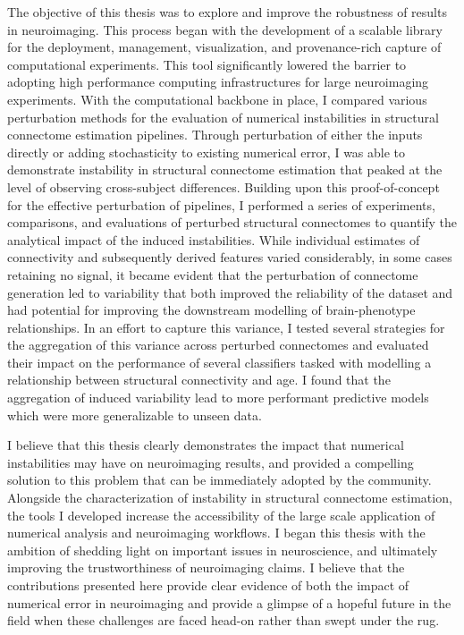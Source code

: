 The objective of this thesis was to explore and improve the robustness of results in neuroimaging. This process
began with the development of a scalable library for the deployment, management, visualization, and
provenance-rich capture of computational experiments. This tool significantly lowered the barrier to adopting high
performance computing infrastructures for large neuroimaging experiments. With the computational backbone in place,
I compared various perturbation methods for the evaluation of numerical instabilities in structural connectome
estimation pipelines. Through perturbation of either the inputs directly or adding stochasticity to existing
numerical error, I was able to demonstrate instability in structural connectome estimation that peaked at the level
of observing cross-subject differences. Building upon this proof-of-concept for the effective perturbation of
pipelines, I performed a series of experiments, comparisons, and evaluations of perturbed structural connectomes to
quantify the analytical impact of the induced instabilities. While individual estimates of connectivity and
subsequently derived features varied considerably, in some cases retaining no signal, it became evident that the
perturbation of connectome generation led to variability that both improved the reliability of the dataset and had
potential for improving the downstream modelling of brain-phenotype relationships. In an effort to capture this
variance, I tested several strategies for the aggregation of this variance across perturbed connectomes and
evaluated their impact on the performance of several classifiers tasked with modelling a relationship between
structural connectivity and age. I found that the aggregation of induced variability lead to more performant
predictive models which were more generalizable to unseen data.

I believe that this thesis clearly demonstrates the impact that numerical instabilities may have on neuroimaging
results, and provided a compelling solution to this problem that can be immediately adopted by the community.
Alongside the characterization of instability in structural connectome estimation, the tools I developed increase the
accessibility of the large scale application of numerical analysis and neuroimaging workflows. I began this thesis
with the ambition of shedding light on important issues in neuroscience, and ultimately improving the trustworthiness
of neuroimaging claims. I believe that the contributions presented here provide clear evidence of both the impact of
numerical error in neuroimaging and provide a glimpse of a hopeful future in the field when these challenges are
faced head-on rather than swept under the rug.

